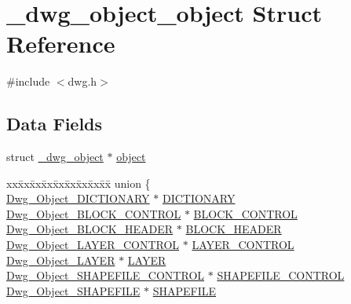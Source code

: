 \hypertarget{struct__dwg__object__object}{\section{\-\_\-dwg\-\_\-object\-\_\-object \-Struct \-Reference}
\label{struct__dwg__object__object}
}


{\ttfamily \#include $<$dwg.\-h$>$}

\subsection*{\-Data \-Fields}
\begin{DoxyCompactItemize}
\item 
struct \hyperlink{struct__dwg__object}{\-\_\-dwg\-\_\-object} $\ast$ \hyperlink{struct__dwg__object__object_a749e2f588a689f2a1d140d768743c235}{object}
\item 
\begin{tabbing}
xx\=xx\=xx\=xx\=xx\=xx\=xx\=xx\=xx\=\kill
union \{\\
\>\hyperlink{dwg_8h_a30a6c8fdcffc239db79793c7e36f5817}{Dwg\_Object\_DICTIONARY} $\ast$ \hyperlink{struct__dwg__object__object_ad499a27c089af02f52dfdb97ecae1368}{DICTIONARY}\\
\>\hyperlink{dwg_8h_a9883cf82a57e46a031e1803aa879a72d}{Dwg\_Object\_BLOCK\_CONTROL} $\ast$ \hyperlink{struct__dwg__object__object_a5daac885f2b2465c820a6e0b2d25da84}{BLOCK\_CONTROL}\\
\>\hyperlink{dwg_8h_a7b15c406a9f9722e8b7943dda5d8359b}{Dwg\_Object\_BLOCK\_HEADER} $\ast$ \hyperlink{struct__dwg__object__object_a2ebd1a4a778c3997ebf0408cede90afc}{BLOCK\_HEADER}\\
\>\hyperlink{dwg_8h_a3a9cd207b8a31eb70b085c12059aee34}{Dwg\_Object\_LAYER\_CONTROL} $\ast$ \hyperlink{struct__dwg__object__object_a3ab59c290717955206f7f6989e3f15c5}{LAYER\_CONTROL}\\
\>\hyperlink{dwg_8h_ab68222f8cd4a0606e80d0f242ad87589}{Dwg\_Object\_LAYER} $\ast$ \hyperlink{struct__dwg__object__object_a4c9ffea6cd1bfa208fc11655a458bbed}{LAYER}\\
\>\hyperlink{dwg_8h_a2ff7b9a32dbd6ae3ba9fceb021bbdcaf}{Dwg\_Object\_SHAPEFILE\_CONTROL} $\ast$ \hyperlink{struct__dwg__object__object_a7a5965c8d0597573552f120235b79b9e}{SHAPEFILE\_CONTROL}\\
\>\hyperlink{dwg_8h_abf179183a2831b539b455b09cfef2e71}{Dwg\_Object\_SHAPEFILE} $\ast$ \hyperlink{struct__dwg__object__object_a5932d827e2a0f8ad708b7507be5b03d1}{SHAPEFILE}\\

\end{tabbing}
\end{DoxyCompactItemize}
